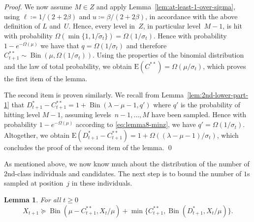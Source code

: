 \documentclass[11pt, a4paper]{article}
\newtheorem{lemma}{Lemma}
\newcommand*{\E}{\mathrm{E}}
\DeclareMathOperator{\Bin}{Bin}
\begin{document}
\begin{proof}
		
		
		
		We  now assume $M\in Z$ and 
		apply Lemma~\ref{lem:at-least-1-over-sigma}, using $\ell\coloneqq 1/(2+2\beta)$ and 
		$u\coloneqq \beta/(2+2\beta)$, in accordance with the above definition of $L$ and~$U$. 
		Hence, every level in~$Z$, in particular level~$M-1$, is 
		hit with probability $\Omega(\min\{1,1/\tilde{\sigma}_t\}) = \Omega(1/\sigma_t)$. 
		Hence with probability~$1-e^{-\Omega(\mu)}$ 
		we have that $q=\Omega(1/\sigma_t)$ and therefore 
		$C^{**}_{t+1}  \sim \Bin(\mu,\Omega(1/\sigma_t))$. 
		Using the properties 
		of the binomial distribution and the law of total probability, 
		we obtain $\E(C^{**}) = \Omega(\mu/\sigma_t)$, which proves the first item 
		of the lemma. 
		
		The second item is proven similarly. 
		 We recall from 
		Lemma~\ref{lem:2nd-lower-part-1} that 
		$D^*_{t+1}-C^{**}_{t+1} = 1+ \Bin(\lambda-\mu-1,q')$ 
		where $q'$ is the probability of hitting level $M-1$, assuming levels~$n-1,\dots,M$ 
		have been sampled. 
    Hence 	
		with probability $1-e^{-\Omega(\mu)}$ according to \eqref{eq:lemma8-minz}, 
		we have $q'=\Omega(1/\sigma_t)$.
		Altogether, we obtain 
		$\E(D^*_{t+1}-C^{**}_{t+1})=1+\Omega((\lambda-\mu-1)/\sigma_t)$, which concludes the  proof of the 
		second item of the lemma.
\qed\end{proof}

As mentioned above, we now know much about the distribution of 
the number of $2$nd-class individuals and candidates. The next step is 
to bound the number of $1$s sampled at position~$j$ in these individuals.


\begin{lemma}
\label{lem:2nd-lower-part-2}
For all $t\ge 0$
\[
X_{t+1}\succeq \Bin(\mu-C^{**}_{t+1},X_t/\mu)+\min\{C^{**}_{t+1},\Bin(D^*_{t+1},X_t/\mu)\}.
\]
\end{lemma}
\end{document}
